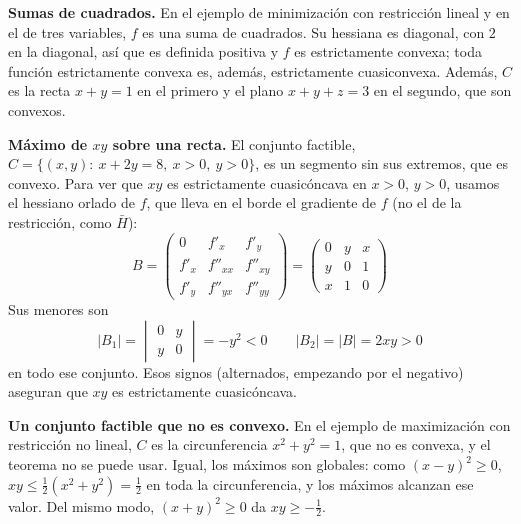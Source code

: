 \documentclass{article}
\begin{document}
\noindent\textbf{Sumas de cuadrados.} En el ejemplo de minimización con restricción lineal y en el de tres variables, \(f\) es una suma de cuadrados. Su hessiana es diagonal, con \(2\) en la diagonal, así que es definida positiva y \(f\) es estrictamente convexa; toda función estrictamente convexa es, además, estrictamente cuasiconvexa. Además, \(C\) es la recta \(x+y=1\) en el primero y el plano \(x+y+z=3\) en el segundo, que son convexos.


\medskip

\noindent\textbf{Máximo de \(xy\) sobre una recta.} El conjunto factible, \(C=\{(x,y):\ x+2y=8,\ x>0,\ y>0\}\), es un segmento sin sus extremos, que es convexo. Para ver que \(xy\) es estrictamente cuasicóncava en \(x>0\), \(y>0\), usamos el hessiano orlado de \(f\), que lleva en el borde el gradiente de \(f\) (no el de la restricción, como \(\bar H\)):
\[
B=
\begin{pmatrix}
0 & f'_x & f'_y\\
f'_x & f''_{xx} & f''_{xy}\\
f'_y & f''_{yx} & f''_{yy}
\end{pmatrix}
=
\begin{pmatrix}
0 & y & x\\
y & 0 & 1\\
x & 1 & 0
\end{pmatrix}
\]
Sus menores son
\[
|B_1|=
\begin{vmatrix}
0 & y\\
y & 0
\end{vmatrix}
=-y^2<0
\qquad
|B_2|=|B|=2xy>0
\]
en todo ese conjunto. Esos signos (alternados, empezando por el negativo) aseguran que \(xy\) es estrictamente cuasicóncava.


\medskip

\noindent\textbf{Un conjunto factible que no es convexo.} En el ejemplo de maximización con restricción no lineal, \(C\) es la circunferencia \(x^2+y^2=1\), que no es convexa, y el teorema no se puede usar. Igual, los máximos son globales: como \((x-y)^2\ge0\), \(xy\le\tfrac12(x^2+y^2)=\tfrac12\) en toda la circunferencia, y los máximos alcanzan ese valor. Del mismo modo, \((x+y)^2\ge0\) da \(xy\ge-\tfrac12\).
\end{document}
